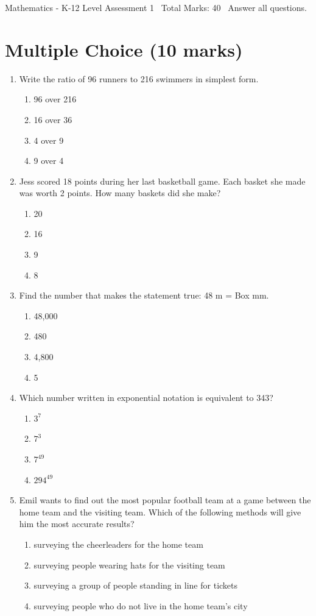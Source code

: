 \documentclass[12pt]{article}
\begin{document}
\begin{center}
Mathematics - K-12 Level Assessment 1 \
Total Marks: 40 \
Answer all questions.
\end{center}

\section*{Multiple Choice (10 marks)}
\begin{enumerate}[label=\arabic*.]
\item Write the ratio of 96 runners to 216 swimmers in simplest form.
\begin{enumerate}[label=(\alph*)]
    \item 96 over 216
    \item 16 over 36
    \item 4 over 9
    \item 9 over 4
\end{enumerate}
\item Jess scored 18 points during her last basketball game. Each basket she made was worth 2 points. How many baskets did she make?
\begin{enumerate}[label=(\alph*)]
    \item 20
    \item 16
    \item 9
    \item 8
\end{enumerate}
\item Find the number that makes the statement true: 48 m = Box mm.
\begin{enumerate}[label=(\alph*)]
    \item 48,000
    \item 480
    \item 4,800
    \item 5
\end{enumerate}
\item Which number written in exponential notation is equivalent to 343?
\begin{enumerate}[label=(\alph*)]
    \item $3^7$
    \item $7^3$
    \item $7^49$
    \item $294^49$
\end{enumerate}
\item Emil wants to find out the most popular football team at a game between the home team and the visiting team. Which of the following methods will give him the most accurate results?
\begin{enumerate}[label=(\alph*)]
    \item surveying the cheerleaders for the home team
    \item surveying people wearing hats for the visiting team
    \item surveying a group of people standing in line for tickets
    \item surveying people who do not live in the home team's city
\end{enumerate}
\end{enumerate}
\end{document}
